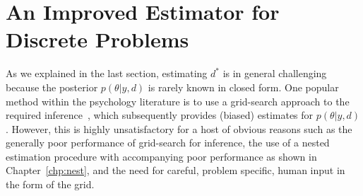 
\section{An Improved Estimator for Discrete Problems}
\label{sec:bo-design}

As we explained in the last section, estimating $d^*$ is in general challenging
because the posterior $p(\theta |y, d)$ is rarely known in closed form.  
One popular method within the psychology literature is to use a grid-search approach 
to the required inference~\citep{PSImethod:1999, Prins:2013gr}, 
which subsequently provides (biased) estimates for $p(\theta |y, d)$.
However, this is highly unsatisfactory for a host of obvious reasons such as the generally
poor performance of grid-search for inference, the use of a nested estimation procedure
with accompanying poor performance as shown in Chapter~\ref{chp:nest}, and the need for careful, problem specific,
human input in the form of the grid.

